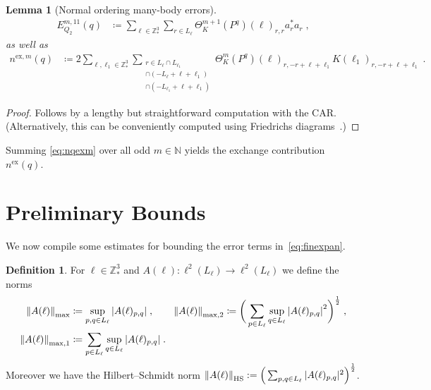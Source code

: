 \documentclass[12pt,a4paper]{article}
\numberwithin{equation}{section}
\newcommand{\1}{\mathbb{I}}
\newcommand{\ex}{\mathrm{ex}}
\newcommand{\HS}{\mathrm{HS}}
\newcommand{\Nbb}{\mathbb{N}}
\newcommand{\Z}{\mathbb{Z}}
\newcommand{\half}{\frac{1}{2}}
\theoremstyle{plain}
\newtheorem{lemma}[theorem]{Lemma}
\theoremstyle{definition}
\newtheorem{definition}[theorem]{Definition}
\theoremstyle{remark}
\theoremstyle{plain}
\theoremstyle{definition}
\theoremstyle{remark}
\begin{document}
\begin{lemma}[Normal ordering many-body errors]
\begin{align}
	E_{Q_2}^{m,11}(q)
	&\coloneq \sum_{\ell \in \Z^3_*} \sum_{r\in L_{\ell}}\Theta^{m+1}_{K}(P^q)(\ell)_{r,r} a^*_{r}a_{r} \;, \label{eq:expandedEQ2}
\end{align}
as well as
\begin{align}
	n^{\ex,m}(q)
	&\coloneq 2 \sum_{\ell,\ell_1 \in \Z^3_*}\sum_{\substack{r\in L_{\ell} \cap L_{\ell_1}\\ \cap (-L_{\ell}+\ell+\ell_1) \\ \cap (-L_{\ell_1}+\ell+\ell_1 )}} \!\!\!\Theta^m_{K}(P^q)(\ell)_{r,-r+\ell+\ell_1}K(\ell_1)_{r,-r+\ell+\ell_1} \;. \label{eq:nqexm}
\end{align}
\end{lemma}
\begin{proof}
Follows by a lengthy but straightforward computation with the CAR. (Alternatively, this can be conveniently computed using Friedrichs diagrams~\cite{BL23}.)
\end{proof}

Summing \eqref{eq:nqexm} over all odd $m \in \Nbb$ yields the exchange contribution $ n^{\ex}(q) $.






\section{Preliminary Bounds}
\label{sec:prelim_bounds}

We now compile some estimates for bounding the error terms in~\eqref{eq:finexpan}.

\begin{definition}
For $ \ell \in \Z^3_*$ and $A(\ell) : \ell^2(L_\ell) \to \ell^2(L_\ell)$ we define the norms
\begin{equation}
\begin{aligned}
	\norm{A(\ell)}_{\max}
	&\coloneq \sup\limits_{p,q \in L_\ell}\abs{A(\ell)_{p,q}} \;, \qquad
	\norm{A(\ell)}_{\max,2}
	\coloneq \bigg(\sum_{p \in L_\ell}
	\sup\limits_{q \in L_\ell}
	\abs{A(\ell)_{p,q}}^2\bigg)^\half \;, \\
	\norm{A(\ell)}_{\mathrm{max,1}}
	&\coloneq \sum_{p \in L_\ell}
	\sup\limits_{q \in L_\ell}
	\abs{A(\ell)_{p,q}} \;.
\end{aligned}
\end{equation}
Moreover we have the Hilbert--Schmidt norm $ \norm{A(\ell)}_{\HS} := \Big( \sum_{p,q \in L_\ell} |A(\ell)_{p,q}|^2 \Big)^{\half} $.
\end{definition}
\end{document}
